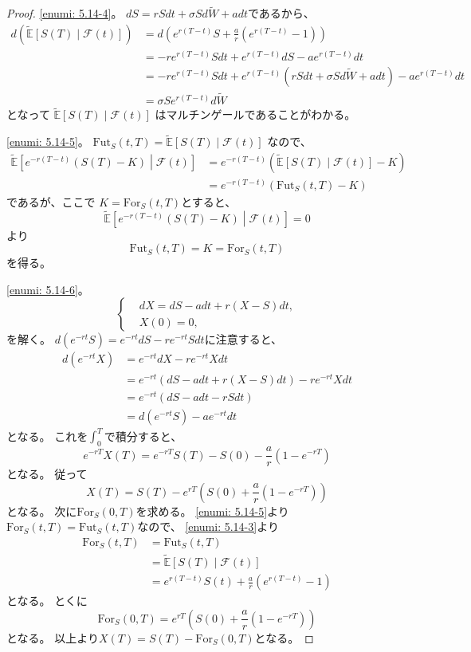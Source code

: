 \documentclass[uplatex]{jsarticle}
\theoremstyle{definition}
\def\E{\mathbb{E}}
\def\mcF{\mathcal{F}}
\begin{document}
\begin{proof}
  \ref{enumi: 5.14-4}。
  \(dS = rSdt + \sigma Sd\tilde{W} + adt\)であるから、
  \begin{align*}
    d\left( \tilde{\E} \left[S(T)\middle| \mcF(t)\right] \right)
    &= d\left( e^{r(T-t)}S
    + \frac{a}{r}(e^{r(T-t)}-1)\right) \\
    &= -re^{r(T-t)}Sdt + e^{r(T-t)}dS - ae^{r(T-t)}dt \\
    &= -re^{r(T-t)}Sdt
    + e^{r(T-t)}(rSdt + \sigma Sd\tilde{W} + adt)
    - ae^{r(T-t)}dt \\
    &= \sigma Se^{r(T-t)}d\tilde{W}
  \end{align*}
  となって
  \(\tilde{\E} \left[S(T)\middle| \mcF(t)\right]\)
  はマルチンゲールであることがわかる。

  \ref{enumi: 5.14-5}。
  \(\mathrm{Fut}_S(t,T) = \tilde{\E}\left[ S(T) \middle| \mcF(t)\right]\)
  なので、
  \begin{align*}
    \tilde{\E}\left[e^{-r(T-t)}\left( S(T)-K \right)
    \middle| \mcF(t) \right]
    &= e^{-r(T-t)}\left(
    \tilde{\E}\left[ S(T) \middle| \mcF(t)\right] - K \right) \\
    &= e^{-r(T-t)}\left( \mathrm{Fut}_S(t,T) - K  \right)
  \end{align*}
  であるが、ここで
  \(K=\mathrm{For}_S(t,T)\)とすると、
  \[
  \tilde{\E}\left[e^{-r(T-t)}\left( S(T)-K \right)
  \middle| \mcF(t) \right] = 0
  \]
  より
  \[
  \mathrm{Fut}_S(t,T) = K = \mathrm{For}_S(t,T)
  \]
  を得る。

  \ref{enumi: 5.14-6}。
  \[
  \begin{cases}
    &dX = dS - adt + r(X-S)dt, \\
    &X(0) = 0,
  \end{cases}
  \]
  を解く。
  \(d(e^{-rt}S) = e^{-rt}dS - re^{-rt}Sdt\)に注意すると、
  \begin{align*}
    d(e^{-rt}X) &= e^{-rt}dX - re^{-rt}Xdt \\
    &= e^{-rt}\left( dS - adt + r(X-S)dt\right) - re^{-rt}Xdt \\
    &= e^{-rt}\left( dS - adt - rSdt\right) \\
    &= d(e^{-rt}S) - ae^{-rt}dt
  \end{align*}
  となる。
  これを\(\int_0^T\)で積分すると、
  \[
  e^{-rT}X(T) = e^{-rT}S(T) - S(0) - \frac{a}{r}(1-e^{-rT})
  \]
  となる。
  従って
  \[
  X(T) = S(T) - e^{rT}\left( S(0) + \frac{a}{r}(1-e^{-rT})\right)
  \]
  となる。
  次に\(\mathrm{For}_S(0,T)\)を求める。
  \ref{enumi: 5.14-5}より
  \(\mathrm{For}_S(t,T) = \mathrm{Fut}_S(t,T)\)なので、
  \ref{enumi: 5.14-3}より
  \begin{align*}
    \mathrm{For}_S(t,T)
    &= \mathrm{Fut}_S(t,T) \\
    &= \tilde{\E}[S(T)\mid\mcF(t)] \\
    &= e^{r(T-t)}S(t)
    + \frac{a}{r}(e^{r(T-t)}-1)
  \end{align*}
  となる。
  とくに
  \[
  \mathrm{For}_S(0,T) =
  e^{rT}\left( S(0) + \frac{a}{r}(1-e^{-rT})\right)
  \]
  となる。
  以上より\(X(T) = S(T) - \mathrm{For}_S(0,T)\)となる。

\end{proof}
\end{document}
